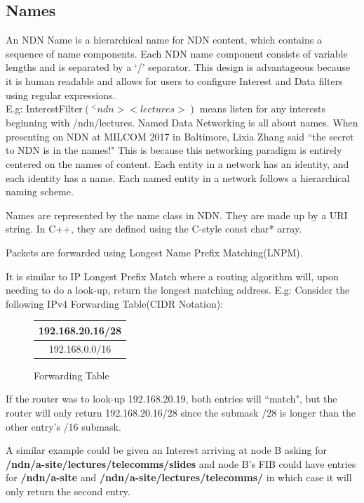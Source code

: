\subsection{Names}
An NDN Name is a hierarchical name for NDN content, which contains a sequence of name components.\cite{018} Each NDN name component  consists of variable lengths and is separated by a `/' separator. This design is advantageous because it is human readable and allows for users to configure Interest and Data filters using regular expressions. \\
E.g: InterestFilter$(^<ndn><lectures>)$ means listen for any interests beginning with /ndn/lectures. 
Named Data Networking is all about names. When presenting on NDN at MILCOM 2017 in Baltimore, Lixia Zhang said ``the secret to NDN is in the names!" This is because this networking paradigm  is entirely centered on the names of content. Each entity in a network has an identity, and each identity has a name. Each named entity in a network follows a hierarchical naming scheme.\par
Names are represented by the name class in NDN. They are made up by a URI string. In C++, they are defined using the C-style const char* array. \par
Packets are forwarded using Longest Name Prefix Matching(LNPM)\cite{019}. 

It is similar to IP Longest Prefix Match where a routing algorithm will, upon needing to do a look-up, return the longest matching address. E.g:
Consider the following IPv4 Forwarding Table(CIDR Notation):\\
\begin{figure}[ht]
\centering
\begin{tabular}{|c|}
\hline
192.168.20.16/28\\
\hline
192.168.0.0/16\\
\hline
\end{tabular}
\caption{Forwarding Table}
\end{figure}

If the router was to look-up 192.168.20.19, both entries will ``match", but the router will only return 192.168.20.16/28 since the submask /28 is longer than the other entry's /16 submask\cite{020}.

A similar example could be given an Interest arriving at node B asking for \textbf{/ndn/a-site/lectures/telecomms/slides}  and node B's FIB could have entries for \textbf{/ndn/a-site} and \textbf{/ndn/a-site/lectures/telecomms/} in which case it will only return the second entry. \par 

